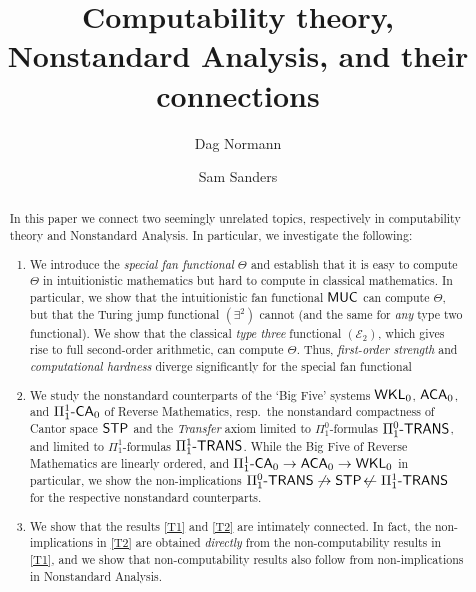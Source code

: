 \documentclass[reqno]{amsart}
\def\FIVE{\Pi_{1}^{1}\text{-\textsf{CA}}_{0}}
\def\STP{\textup{\textsf{STP}}}
\def\WKL{\textup{\textsf{WKL}}}
\def\E{{\mathcal  E}}
\def\MUC{\textup{\textsf{MUC}}}
\def\di{\rightarrow}
\def\ACA{\textup{\textsf{ACA}}}
\def\paai{\Pi_{1}^{0}\textup{-\textsf{TRANS}}}
\def\Paai{\Pi_{1}^{1}\textup{-\textsf{TRANS}}}
\numberwithin{equation}{section}
\numberwithin{thm}{section}
\begin{document}
\title[Computability theory and Nonstandard Analysis]{Computability theory, Nonstandard Analysis, and their connections}
\author{Dag Normann}
\address{Department of Mathematics, The University 
of Oslo, P.O. Box 1053, Blindern N-0316 Oslo, Norway}
\author{Sam Sanders}
\address{Munich Center for Mathematical Philosophy, LMU Munich, Germany \& Department of Mathematics, Ghent University}

\begin{abstract}
In this paper we connect two seemingly unrelated topics, respectively in computability theory and Nonstandard Analysis.  %
In particular, we investigate the following:
\begin{enumerate}
 \renewcommand{\theenumi}{T.\arabic{enumi}}
\item We introduce the \emph{special fan functional} $\Theta$ and establish that it is easy to compute $\Theta$ in intuitionistic mathematics but hard to compute in classical mathematics.  
In particular, we show that the intuitionistic fan functional $\MUC$ can compute $\Theta$, but that the Turing jump functional $(\exists^{2})$ cannot (and the same for \emph{any} type two functional).
We show that the classical \emph{type three} functional $(\E_{2})$, which gives rise to full second-order arithmetic, can compute $\Theta$.  
Thus, \emph{first-order strength} and \emph{computational hardness} diverge significantly for the special fan functional \label{T1}
\item We study the nonstandard counterparts of the `Big Five' systems $\WKL_{0}$, $\ACA_{0}$, and $\FIVE$ of Reverse Mathematics, resp.\ the nonstandard compactness of Cantor space $\STP$ and the \emph{Transfer} axiom limited to $\Pi_{1}^{0}$-formulas $\paai$, and limited to $\Pi_{1}^{1}$-formulas $\Paai$.  While the Big Five of Reverse Mathematics are linearly ordered, 
and $\FIVE\di \ACA_{0}\di \WKL_{0}$ in particular, we show the non-implications $\paai\not\di \STP\not\!\leftarrow \Paai$ for the respective nonstandard counterparts.\label{T2}  %

\item We show that the results \eqref{T1} and \eqref{T2} are intimately connected.  In fact, the non-implications in \eqref{T2} are obtained \emph{directly} from the non-computability results in \eqref{T1}, and we show that non-computability results also follow from non-implications in Nonstandard Analysis.  
\end{enumerate}
\end{abstract}
\end{document}
